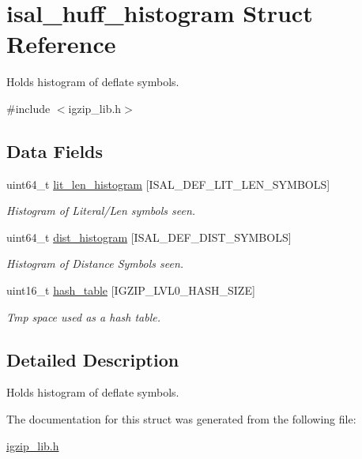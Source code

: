 \hypertarget{structisal__huff__histogram}{\section{isal\-\_\-huff\-\_\-histogram Struct Reference}
\label{structisal__huff__histogram}
}


Holds histogram of deflate symbols.  




{\ttfamily \#include $<$igzip\-\_\-lib.\-h$>$}

\subsection*{Data Fields}
\begin{DoxyCompactItemize}
\item 
\hypertarget{structisal__huff__histogram_ac17cf755b424f646110fb72514cac916}{uint64\-\_\-t \hyperlink{structisal__huff__histogram_ac17cf755b424f646110fb72514cac916}{lit\-\_\-len\-\_\-histogram} \mbox{[}I\-S\-A\-L\-\_\-\-D\-E\-F\-\_\-\-L\-I\-T\-\_\-\-L\-E\-N\-\_\-\-S\-Y\-M\-B\-O\-L\-S\mbox{]}}\label{structisal__huff__histogram_ac17cf755b424f646110fb72514cac916}

\begin{DoxyCompactList}\small\item\em Histogram of Literal/\-Len symbols seen. \end{DoxyCompactList}\item 
\hypertarget{structisal__huff__histogram_a01f4b69ba1d34810baa98ce185248723}{uint64\-\_\-t \hyperlink{structisal__huff__histogram_a01f4b69ba1d34810baa98ce185248723}{dist\-\_\-histogram} \mbox{[}I\-S\-A\-L\-\_\-\-D\-E\-F\-\_\-\-D\-I\-S\-T\-\_\-\-S\-Y\-M\-B\-O\-L\-S\mbox{]}}\label{structisal__huff__histogram_a01f4b69ba1d34810baa98ce185248723}

\begin{DoxyCompactList}\small\item\em Histogram of Distance Symbols seen. \end{DoxyCompactList}\item 
\hypertarget{structisal__huff__histogram_a7c131c72a6a7336c6ecc98d731998e09}{uint16\-\_\-t \hyperlink{structisal__huff__histogram_a7c131c72a6a7336c6ecc98d731998e09}{hash\-\_\-table} \mbox{[}I\-G\-Z\-I\-P\-\_\-\-L\-V\-L0\-\_\-\-H\-A\-S\-H\-\_\-\-S\-I\-Z\-E\mbox{]}}\label{structisal__huff__histogram_a7c131c72a6a7336c6ecc98d731998e09}

\begin{DoxyCompactList}\small\item\em Tmp space used as a hash table. \end{DoxyCompactList}\end{DoxyCompactItemize}


\subsection{Detailed Description}
Holds histogram of deflate symbols. 

The documentation for this struct was generated from the following file\-:\begin{DoxyCompactItemize}
\item 
\hyperlink{igzip__lib_8h}{igzip\-\_\-lib.\-h}\end{DoxyCompactItemize}

